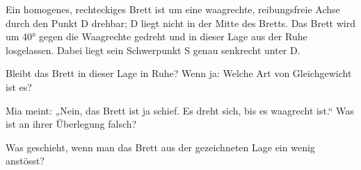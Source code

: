 Ein homogenes, rechteckiges Brett ist um eine waagrechte, reibungsfreie Achse durch den Punkt D drehbar; D liegt nicht in der Mitte des Bretts. Das Brett wird um \ang{40} gegen die Waagrechte gedreht und in dieser Lage aus der Ruhe losgelassen. Dabei liegt sein Schwerpunkt S genau senkrecht unter D.
\begin{center}
\end{center}

\begin{abcliste}
\abc
Bleibt das Brett in dieser Lage in Ruhe? Wenn ja: Welche Art von Gleichgewicht ist es?

\abc
Mia meint: „Nein, das Brett ist ja schief. Es dreht sich, bis es waagrecht ist.“ Was ist an ihrer Überlegung falsch?

\abc
Was geschieht, wenn man das Brett aus der gezeichneten Lage ein wenig anstösst?
\end{abcliste}
